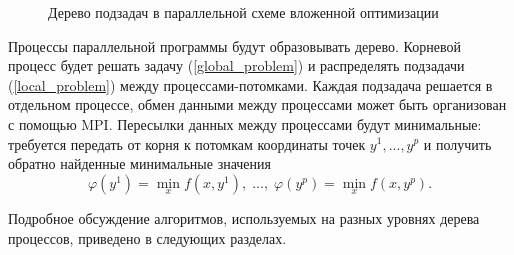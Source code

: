 \documentclass{svproc}
\begin{document}
\begin{figure}
\caption{Дерево подзадач в параллельной схеме вложенной оптимизации}
\label{MPI_tree}
\end{figure}

Процессы параллельной программы будут образовывать дерево. 
Корневой процесс будет решать задачу (\ref{global_problem}) и распределять подзадачи (\ref{local_problem}) между процессами-потомками. Каждая подзадача решается в отдельном процессе, обмен данными между процессами может быть организован с помощью MPI. Пересылки данных между процессами будут минимальные: требуется передать от корня к потомкам координаты точек $y^1, ..., y^p$ и получить обратно найденные минимальные значения 
\[
\varphi(y^1) = \min_x f(x,y^1),\; ..., \; \varphi(y^p) = \min_x f(x,y^p).
\]

Подробное обсуждение алгоритмов, используемых на разных уровнях дерева процессов, приведено в следующих разделах.  
\end{document}
